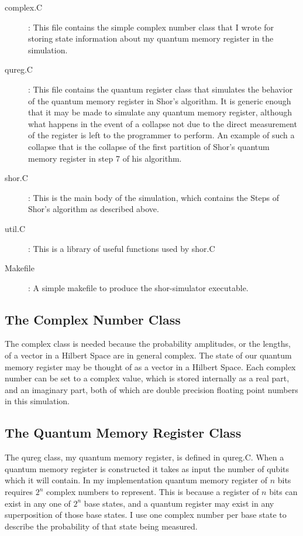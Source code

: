 \documentclass[]{article}
\begin{document}
\begin{description}

\item[complex.C]: This file contains the simple complex number class
  that I wrote for storing state information about my quantum memory
  register in the simulation.

\item[qureg.C]: This file contains the quantum register class that
  simulates the behavior of the quantum memory register in Shor's
  algorithm.  It is generic enough that it may be made to simulate any
  quantum memory register, although what happens in the event of a
  collapse not due to the direct measurement of the register is left
  to the programmer to perform.  An example of such a collapse that is
  the collapse of the first partition of Shor's quantum memory
  register in step 7 of his algorithm.

\item[shor.C]: This is the main body of the simulation, which
  contains the Steps of Shor's algorithm as described above.

\item[util.C]: This is a library of useful functions used by
  shor.C

\item[Makefile]: A simple makefile to produce the shor-simulator
  executable.

\end{description}

\subsection{The Complex Number Class}

The complex class is needed because the probability amplitudes, or the
lengths, of a vector in a Hilbert Space are in general complex.  The
state of our quantum memory register may be thought of as a vector in
a Hilbert Space.  Each complex number can be set to a complex value,
which is stored internally as a real part, and an imaginary part, both
of which are double precision floating point numbers in this
simulation.

\subsection{The Quantum Memory Register Class}

The qureg class, my quantum memory register, is defined in qureg.C.
When a quantum memory register is constructed it takes as input the
number of qubits which it will contain.  In my implementation quantum
memory register of $n$ bits requires $2^{n}$ complex numbers to
represent.  This is because a register of $n$ bits can exist in any
one of $2^{n}$ base states, and a quantum register may exist in any
superposition of those base states.  I use one complex number per base
state to describe the probability of that state being measured.
\end{document}
